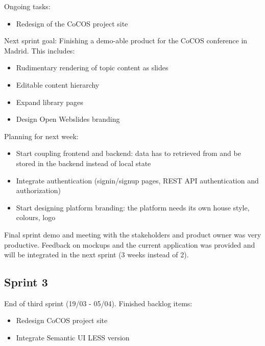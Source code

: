 \documentclass[10pt,a4paper]{article}
\begin{document}
\begin{appendices}
{        Ongoing tasks:

        \begin{itemize}
          \item Redesign of the CoCOS project site
        \end{itemize}

        Next sprint goal: Finishing a demo-able product for the CoCOS conference in Madrid. This includes:

        \begin{itemize}
          \item Rudimentary rendering of topic content as slides
          \item Editable content hierarchy
          \item Expand library pages
          \item Design Open Webslides branding
        \end{itemize}

        Planning for next week:

        \begin{itemize}
          \item Start coupling frontend and backend: data has to retrieved from and be stored in the backend instead of local state
          \item Integrate authentication (signin/signup pages, REST API authentication and authorization)
          \item Start designing platform branding: the platform needs its own house style, colours, logo
        \end{itemize}

        Final sprint demo and meeting with the stakeholders and product owner was very productive.
        Feedback on mockups and the current application was provided and will be integrated in the next sprint (3 weeks instead of 2).

      \subsection*{Sprint 3}
        End of third sprint (19/03 - 05/04).
        Finished backlog items:

        \begin{itemize}
          \item Redesign CoCOS project site
          \item Integrate Semantic UI LESS version
        \end{itemize}

}
\end{appendices}
\end{document}
